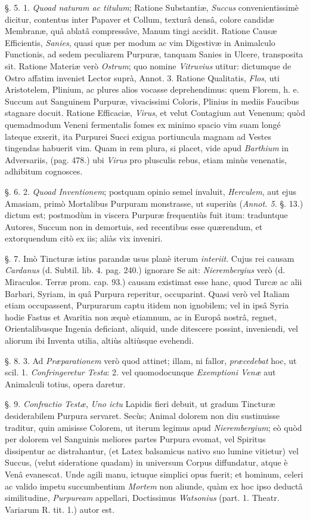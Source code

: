 \documentclass[a4paper, 11pt, oneside, polutonikogreek, german]{article}
\begin{document}
§. 5. 1. \emph{Quoad naturam ac titulum}; Ratione Substantiæ, \emph{Succus} convenientissimè dicitur, contentus inter Papaver et Collum, texturâ densâ, colore candidæ Membranæ, quâ ablatâ compressâve, Manum tingi accidit. Ratione Causæ Efficientis, \emph{Sanies}, quasi quæ per modum ac vim Digestivæ in Animalculo Functionis, ad sedem peculiarem Purpuræ, tanquam Sanies in Ulcere, transposita sit. Ratione Materiæ verò \emph{Ostrum}; quo nomine \emph{Vitruvius} utitur: dictumque de Ostro affatim inveniet Lector suprà, Annot. 3. Ratione Qualitatis, \emph{Flos}, uti Aristotelem, Plinium, ac plures alios vocasse deprehendimus: quem Florem, h. e. Succum aut Sanguinem Purpuræ, vivacissimi Coloris, Plinius in mediis Faucibus stagnare docuit. Ratione Efficaciæ, \emph{Virus}, et velut Contagium aut Venenum; quòd quemadmodum Veneni fermentalis fomes ex minimo spacio vim suam longé lateque exserit, ita Purpurei Succi exigua portiuncula magnam ad Vestes tingendas habuerit vim. Quam in rem plura, si placet, vide apud \emph{Barthium} in Adversariis, (pag. 478.) ubi \emph{Virus} pro plusculis rebus, etiam minùs venenatis, adhibitum cognosces.

§. 6. 2. \emph{Quoad Inventionem}; postquam opinio semel invaluit, \emph{Herculem}, aut ejus Amasiam, primò Mortalibus Purpuram monstrasse, ut superiùs (\emph{Annot. 5.} §. 13.) dictum est; postmodùm in viscera Purpuræ frequentiùs fuit itum: traduntque Autores, Succum non in demortuis, sed recentibus esse quærendum, et extorquendum citò ex iis; aliàs vix inveniri.

§. 7. Imò Tincturæ istius parandæ usus planè iterum \emph{interiit}. Cujus rei causam \emph{Cardanus} (d. Subtil. lib. 4. pag. 240.) ignorare Se ait: \emph{Nierembergius} verò (d. Miraculos. Terræ prom. cap. 93.) causam existimat esse hanc, quod Turcæ ac alii Barbari, Syriam, in quâ Purpura reperitur, occuparint. Quasi verò vel Italiam etiam occupassent, Purpurarum captu itidem non ignobilem; vel in ipsâ Syria hodie Fastus et Avaritia non æquè etiamnum, ac in Europâ nostrâ, regnet, Orientalibusque Ingenia deficiant, aliquid, unde ditescere possint, inveniendi, vel aliorum ibi Inventa utilia, altiùs altiùsque evehendi.

§. 8. 3. Ad \emph{Præparationem} verò quod attinet; illam, ni fallor, \emph{præcedebat} hoc, ut scil. 1. \emph{Confringeretur Testa}: 2. vel quomodocunque \emph{Exemptioni Venæ} aut Animalculi totius, opera daretur.

§. 9. \emph{Confractio Testæ}, \emph{Uno ictu} Lapidis fieri debuit, ut gradum Tincturæ desiderabilem Purpura servaret. Secùs; Animal dolorem non diu sustinuisse traditur, quin amisisse Colorem, ut iterum legimus apud \emph{Nierembergium}; eò quòd per dolorem vel Sanguinis meliores partes Purpura evomat, vel Spiritus dissipentur ac distrahantur, (et Latex balsamicus nativo suo lumine vitietur) vel Succus, (velut sideratione quadam) in universum Corpus diffundatur, atque è Venâ evanescat. Unde agili manu, ictuque simplici opus fuerit; et hominum, celeri ac valido impetu succumbentium \emph{Mortem} non aliunde, quàm ex hoc ipso deductâ similitudine, \emph{Purpuream} appellari, Doctissimus \emph{Watsonius} (part. 1. Theatr. Variarum R. tit. 1.) autor est.
\end{document}
